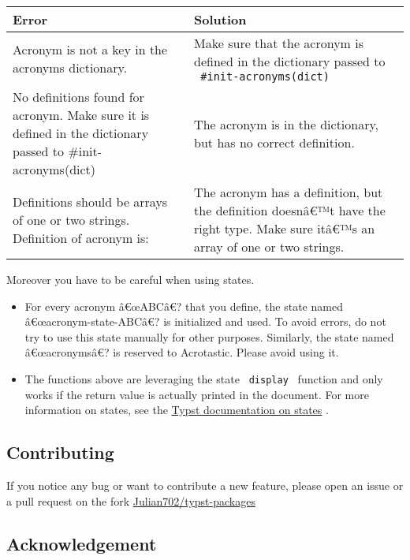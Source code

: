 \begin{longtable}[]{@{}ll@{}}
\toprule\noalign{}
Error & Solution \\
\midrule\noalign{}
\endhead
\bottomrule\noalign{}
\endlastfoot
Acronym is not a key in the acronyms dictionary. & Make sure that the
acronym is defined in the dictionary passed to
\texttt{\ \#init-acronyms(dict)\ } \\
No definitions found for acronym. Make sure it is defined in the
dictionary passed to \#init-acronyms(dict) & The acronym is in the
dictionary, but has no correct definition. \\
Definitions should be arrays of one or two strings. Definition of
acronym is: & The acronym has a definition, but the definition doesnâ€™t
have the right type. Make sure itâ€™s an array of one or two strings. \\
\end{longtable}

Moreover you have to be careful when using states.

\begin{itemize}
\tightlist
\item
  For every acronym â€œABCâ€? that you define, the state named
  â€œacronym-state-ABCâ€? is initialized and used. To avoid errors, do
  not try to use this state manually for other purposes. Similarly, the
  state named â€œacronymsâ€? is reserved to Acrotastic. Please avoid
  using it.
\item
  The functions above are leveraging the state \texttt{\ display\ }
  function and only works if the return value is actually printed in the
  document. For more information on states, see the
  \href{https://typst.app/docs/reference/introspection/state/}{Typst
  documentation on states} .
\end{itemize}

\subsection{Contributing}\label{contributing}

If you notice any bug or want to contribute a new feature, please open
an issue or a pull request on the fork
\href{https://github.com/Julian702/typst-packages?tab=readme-ov-file}{Julian702/typst-packages}

\subsection{Acknowledgement}\label{acknowledgement}

